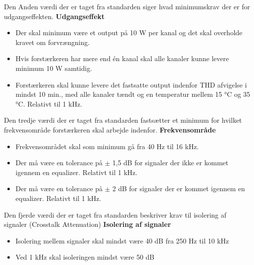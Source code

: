 Den Anden værdi der er taget fra standarden siger hvad minimumskrav der er for udgangseffekten.
\newline
\newline
\textbf{Udgangseffekt}
\begin{itemize}
\item Der skal minimum være et output på 10 W per kanal og det skal overholde kravet om forvrængning.
\item Hvis forstærkeren har mere end én kanal skal alle kanaler kunne levere minimum 10 W samtidig.
\item Forstærkeren skal kunne levere det fastsatte output indenfor THD afvigelse i mindst 10 min., med alle kanaler tændt og en temperatur mellem 15 °C og 35 °C. Relativt til 1 kHz.
\end{itemize}

Den tredje værdi der er taget fra standarden fastsætter et minimum for hvilket frekvensområde forstærkeren skal arbejde indenfor.
\newline 
\newline
\textbf{Frekvensområde}
\begin{itemize}
\item Frekvensområdet skal som minimum gå fra 40 Hz til 16 kHz.
\item Der må være en tolerance på $\pm$ 1,5 dB for signaler der ikke er kommet igennem en equalizer. Relativt til 1 kHz.
\item Der må være en tolerance på $\pm$ 2 dB for signaler der er kommet igennem en equalizer. Relativt til 1 kHz.
\end{itemize}

Den fjerde værdi der er taget fra standarden beskriver krav til isolering af signaler (Crosstalk Attenuation)
\newline 
\newline
\textbf{Isolering af signaler}
\begin{itemize}
\item Isolering mellem signaler skal mindst være 40 dB fra 250 Hz til 10 kHz
\item Ved 1 kHz skal isoleringen mindst være 50 dB
\end{itemize}


